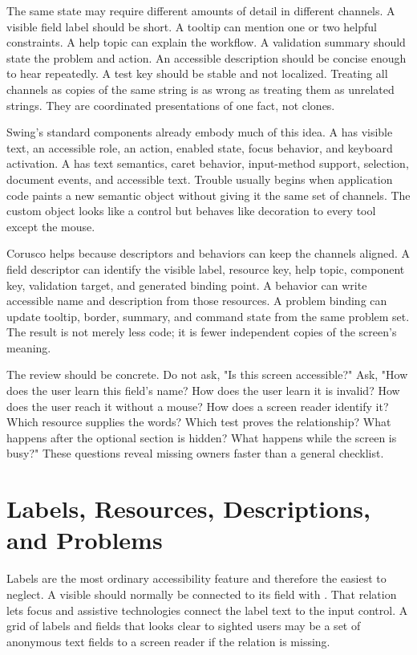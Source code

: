 The same state may require different amounts of detail in different channels.
A visible field label should be short. A tooltip can mention one or two helpful
constraints. A help topic can explain the workflow. A validation summary should
state the problem and action. An accessible description should be concise enough
to hear repeatedly. A test key should be stable and not localized. Treating all
channels as copies of the same string is as wrong as treating them as unrelated
strings. They are coordinated presentations of one fact, not clones.

Swing's standard components already embody much of this idea. A 
has visible text, an accessible role, an action, enabled state, focus behavior,
and keyboard activation. A  has text semantics, caret behavior,
input-method support, selection, document events, and accessible text. Trouble
usually begins when application code paints a new semantic object without
giving it the same set of channels. The custom object looks like a control but
behaves like decoration to every tool except the mouse.

Corusco helps because descriptors and behaviors can keep the channels aligned.
A field descriptor can identify the visible label, resource key, help topic,
component key, validation target, and generated binding point. A behavior can
write accessible name and description from those resources. A problem binding
can update tooltip, border, summary, and command state from the same problem
set. The result is not merely less code; it is fewer independent copies of the
screen's meaning.

The review should be concrete. Do not ask, "Is this screen accessible?" Ask,
"How does the user learn this field's name? How does the user learn it is
invalid? How does the user reach it without a mouse? How does a screen reader
identify it? Which resource supplies the words? Which test proves the
relationship? What happens after the optional section is hidden? What happens
while the screen is busy?" These questions reveal missing owners faster than a
general checklist.

\section{Labels, Resources, Descriptions, and Problems}

Labels are the most ordinary accessibility feature and therefore the easiest to neglect. A visible  should normally be connected to its field with . That relation lets focus and assistive technologies connect the label text to the input control. A grid of labels and fields that looks clear to sighted users may be a set of anonymous text fields to a screen reader if the relation is missing.

